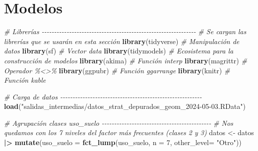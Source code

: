 \documentclass[12pt,a4paper,]{book}
\newenvironment{Shaded}{\begin{snugshade}}{\end{snugshade}}
\newcommand{\AttributeTok}[1]{\textcolor[rgb]{0.13,0.29,0.53}{#1}}
\newcommand{\CommentTok}[1]{\textcolor[rgb]{0.56,0.35,0.01}{\textit{#1}}}
\newcommand{\DecValTok}[1]{\textcolor[rgb]{0.00,0.00,0.81}{#1}}
\newcommand{\FunctionTok}[1]{\textcolor[rgb]{0.13,0.29,0.53}{\textbf{#1}}}
\newcommand{\NormalTok}[1]{#1}
\newcommand{\OtherTok}[1]{\textcolor[rgb]{0.56,0.35,0.01}{#1}}
\newcommand{\SpecialCharTok}[1]{\textcolor[rgb]{0.81,0.36,0.00}{\textbf{#1}}}
\newcommand{\StringTok}[1]{\textcolor[rgb]{0.31,0.60,0.02}{#1}}
\numberwithin{dummy}{section}
\theoremstyle{ocrenumbox}
\theoremstyle{blacknumex}
\theoremstyle{blacknumbox}
\theoremstyle{ocrenum}
\theoremstyle{ocrenum}
\begin{document}
\hypertarget{modelos}{%
\section{Modelos}\label{modelos}}

\begin{Shaded}
\begin{Highlighting}[]
\CommentTok{\# Librerías {-}{-}{-}{-}{-}{-}{-}{-}{-}{-}{-}{-}{-}{-}{-}{-}{-}{-}{-}{-}{-}{-}{-}{-}{-}{-}{-}{-}{-}{-}{-}{-}{-}{-}{-}{-}{-}{-}{-}{-}{-}{-}{-}{-}{-}{-}{-}{-}{-}{-}{-}{-}{-}{-}{-}{-}{-}{-}{-}{-}{-}{-}}
\CommentTok{\# Se cargan las librerías que se usarán en esta sección}
\FunctionTok{library}\NormalTok{(tidyverse) }\CommentTok{\# Manipulación de datos }
\FunctionTok{library}\NormalTok{(sf) }\CommentTok{\# Vector data}
\FunctionTok{library}\NormalTok{(tidymodels) }\CommentTok{\# Ecosistema para la construcción de modelos}
\FunctionTok{library}\NormalTok{(akima) }\CommentTok{\# Función interp}
\FunctionTok{library}\NormalTok{(magrittr) }\CommentTok{\# Operador \%\textless{}\textgreater{}\% }
\FunctionTok{library}\NormalTok{(ggpubr) }\CommentTok{\# Función ggarrange}
\FunctionTok{library}\NormalTok{(knitr) }\CommentTok{\# Función kable}

\CommentTok{\# Carga de datos {-}{-}{-}{-}{-}{-}{-}{-}{-}{-}{-}{-}{-}{-}{-}{-}{-}{-}{-}{-}{-}{-}{-}{-}{-}{-}{-}{-}{-}{-}{-}{-}{-}{-}{-}{-}{-}{-}{-}{-}{-}{-}{-}{-}{-}{-}{-}{-}{-}{-}{-}{-}{-}{-}{-}{-}{-} }
\FunctionTok{load}\NormalTok{(}\StringTok{"salidas\_intermedias/datos\_strat\_depurados\_geom\_2024{-}05{-}03.RData"}\NormalTok{)}

\CommentTok{\# Agrupación clases uso\_suelo {-}{-}{-}{-}{-}{-}{-}{-}{-}{-}{-}{-}{-}{-}{-}{-}{-}{-}{-}{-}{-}{-}{-}{-}{-}{-}{-}{-}{-}{-}{-}{-}{-}{-}{-}{-}{-}{-}{-}{-}{-}{-}{-}{-}}
\CommentTok{\# Nos quedamos con los 7 niveles del factor más frecuentes (clases 2 y 3)}
\NormalTok{datos }\OtherTok{\textless{}{-}}\NormalTok{ datos }\SpecialCharTok{|\textgreater{}} 
  \FunctionTok{mutate}\NormalTok{(}\AttributeTok{uso\_suelo =} \FunctionTok{fct\_lump}\NormalTok{(uso\_suelo,}
                              \AttributeTok{n =} \DecValTok{7}\NormalTok{,}
                              \AttributeTok{other\_level=} \StringTok{"Otro"}\NormalTok{))}


\end{Highlighting}
\end{Shaded}
\end{document}
